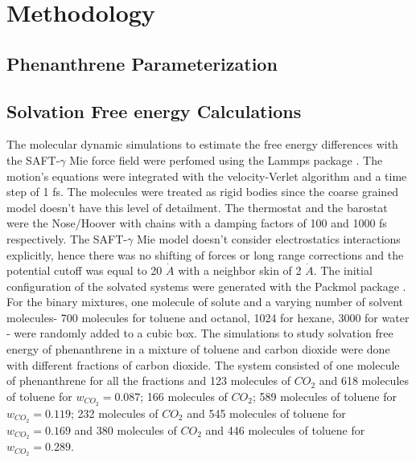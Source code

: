 \chapter{Methodology} %

\label{Chapter4} %

\section{Phenanthrene Parameterization}

\section{Solvation Free energy Calculations}

The molecular dynamic simulations to estimate the free energy differences with the SAFT-$\gamma$ Mie force field were perfomed using the Lammps package \cite{lammps}. The motion's equations were integrated with the velocity-Verlet algorithm \cite{verlet} and a time step of 1 fs. The molecules were treated as rigid bodies since the coarse grained model doesn't have this level of detailment. The thermostat and the barostat were the Nose/Hoover with chains with a damping factors of 100 and 1000 fs respectively. The SAFT-$\gamma$ Mie model doesn't consider electrostatics interactions explicitly, hence there was no shifting of forces or long range corrections and the potential cutoff was equal to 20 $\dot{A}$ with a neighbor skin of 2 $\dot{A}$. The initial configuration of the  solvated systems were generated with the Packmol package \cite{packmol}. For the binary mixtures, one molecule of solute and a varying number of solvent molecules- 700 molecules for toluene and octanol, 1024 for hexane, 3000 for water - were randomly added to a cubic box. The simulations to study solvation free energy of phenanthrene in a mixture of toluene and carbon dioxide were done with different fractions of carbon dioxide. The system consisted of one molecule of phenanthrene for all the fractions and 123 molecules of $CO_{2}$ and 618 molecules of toluene for $w_{CO_{2}} = 0.087$; 166 molecules of $CO_{2}$; 589 molecules of toluene for $w_{CO_{2}} = 0.119$; 232 molecules of $CO_{2}$ and 545 molecules of toluene for $w_{CO_{2}} = 0.169$ and 380 molecules of $CO_{2}$ and 446 molecules of toluene for $w_{CO_{2}} = 0.289$.

